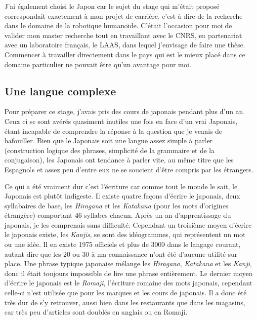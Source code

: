 \documentclass[11pt,journal]{RapportFR}
\begin{document}
\begin{CJK*}{UTF8}{min}
J'ai \'egalement choisi le Japon car le sujet du stage qui m'\'etait propos\'e correspondait exactement \`a mon projet de carri\`ere, c'est \`a dire de la recherche dans le domaine de la robotique humano\"\i de. C'\'etait l'occasion pour moi de valider mon master recherche tout en travaillant avec le CNRS, en partenariat avec un laboratoire fran\c{c}ais, le LAAS, dans lequel j'envisage de faire une th\`ese. Commencer \`a travailler directement dans le pays qui est le mieux plac\'e dans ce domaine particulier ne pouvait \^etre qu'un avantage pour moi.

\subsection{Une langue complexe}

Pour pr\'eparer ce stage, j'avais pris des cours de japonais pendant plus d'un an. Ceux ci se sont av\'er\'es quasiment inutiles une fois en face d'un vrai Japonais, \'etant incapable de comprendre la r\'eponse \`a la question que je venais de bafouiller. Bien que le Japonais soit une langue assez simple \`a parler (construction logique des phrases, simplicit\'e de la grammaire et de la conjugaison), les Japonais ont tendance \`a parler vite, au m\^eme titre que les Espagnols et assez peu d'entre eux ne se soucient d'\^etre compris par les \'etrangers.

Ce qui a \'et\'e vraiment dur c'est l'\'ecriture car comme tout le monde le sait, le Japonais est plut\^ot indigeste. Il existe quatre fa\c{c}ons d'\'ecrire le japonais, deux syllabaires de base, les \textit{Hiragana} et les \textit{Katakana} (pour les mots d'origines \'etrang\`ere) comportant 46 syllabes chacun. Apr\`es un an d'apprentissage du japonais, je les comprenais sans difficult\'e. Cependant un troisi\`eme moyen d'\'ecrire le japonais existe, les \textit{Kanjis}, se sont des id\'eogrammes, qui repr\'esentent un mot ou une id\'ee. Il en existe 1975 officiels et plus de 3000 dans le langage courant, autant dire que les 20 ou 30 \`a ma connaissance n'ont \'et\'e d'aucune utilit\'e sur place. Une phrase typique japonaise m\'elange les \textit{Hiragana}, \textit{Katakana} et les \textit{Kanji}, donc il \'etait toujours impossible de lire une phrase enti\`erement. Le dernier moyen d'\'ecrire le japonais est le \textit{Romaji}, l'\'ecriture romaine des mots japonais, cependant celle-ci n'est utilis\'ee que pour les marques et les cours de japonais.
Il a donc \'et\'e tr\`es dur de s'y retrouver, aussi bien dans les restaurants que dans les magasins, car tr\`es peu d'articles sont doubl\'es en anglais ou en Romaji.


\end{CJK*}
\end{document}
